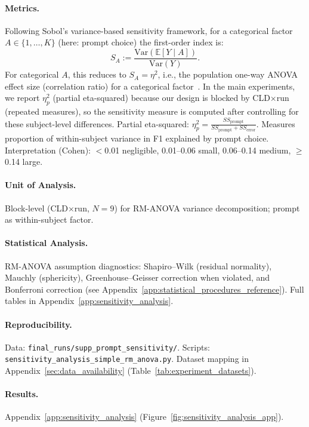 \paragraph{Metrics.}
Following Sobol's variance-based sensitivity framework, for a categorical factor $A\in\{1,\dots,K\}$ (here: prompt choice) the first-order index is:
\begin{equation}
S_A := \frac{\mathrm{Var}(\mathbb{E}[Y \mid A])}{\mathrm{Var}(Y)}.
\end{equation}
For categorical $A$, this reduces to $S_A=\eta^2$,
i.e., the population one-way ANOVA effect size (correlation ratio) for a categorical factor~\cite{saltelli2010variance}. In the main
experiments, we report $\eta^2_p$ (partial eta-squared) because our design is blocked by CLD$\times$run (repeated
measures), so the sensitivity measure is computed after controlling for these subject-level differences.
Partial eta-squared: $\eta^2_p = \frac{SS_{\text{prompt}}}{SS_{\text{prompt}} + SS_{\text{error}}}$. Measures proportion of within-subject variance in F1 explained by prompt choice. Interpretation (Cohen): $<$0.01 negligible, 0.01--0.06 small, 0.06--0.14 medium, $\geq$0.14 large.

\paragraph{Unit of Analysis.}
Block-level (CLD$\times$run, $N=9$) for RM-ANOVA variance decomposition; prompt as within-subject factor.

\paragraph{Statistical Analysis.}
RM-ANOVA assumption diagnostics: Shapiro--Wilk (residual normality), Mauchly (sphericity), Greenhouse--Geisser correction when violated, and Bonferroni correction (see Appendix~\ref{app:statistical_procedures_reference}). Full tables in Appendix~\ref{app:sensitivity_analysis}.

\paragraph{Reproducibility.}
Data: \texttt{final\_runs/supp\_prompt\_sensitivity/}. Scripts: \texttt{sensitivity\_analysis\_simple\_rm\_anova.py}.
Dataset mapping in Appendix~\ref{sec:data_availability} (Table~\ref{tab:experiment_datasets}).

\paragraph{Results.}
Appendix~\ref{app:sensitivity_analysis} (Figure~\ref{fig:sensitivity_analysis_app}).

